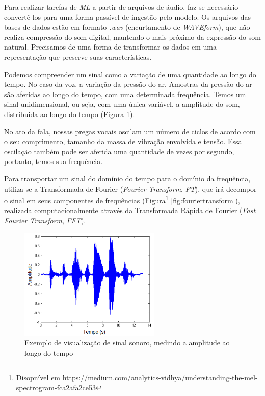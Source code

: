 Para realizar tarefas de \textit{ML} a partir de arquivos de áudio, faz-se necessário convertê-los para uma forma passível de ingestão pelo modelo. Os arquivos das bases de dados estão em formato \textit{.wav} (encurtamento de \textit{WAVEform}), que não realiza compressão do som digital, mantendo-o mais próximo da expressão do som natural. Precisamos de uma forma de transformar os dados em uma representação que preserve suas características.

Podemos compreender um sinal como a variação de uma quantidade ao longo do tempo. No caso da voz, a variação da pressão do ar. Amostras da pressão do ar são aferidas ao longo do tempo, com uma determinada frequência. Temos um sinal unidimensional, ou seja, com uma única variável, a amplitude do som, distribuida ao longo do tempo (Figura \ref{fig:exsinalsom}).

No ato da fala, nossas pregas vocais oscilam um número de ciclos de acordo com o  seu comprimento, tamanho da massa de vibração envolvida e tensão. Essa oscilação também pode ser aferida uma quantidade de vezes por segundo, portanto, temos sua frequência.

Para transportar um sinal do domínio do tempo para o domínio da frequência, utiliza-se a Transformada de Fourier (\textit{Fourier Transform}, \textit{FT}), que irá decompor o sinal em seus componentes de frequências (Figura\footnote{Disopnível em \url{https://medium.com/analytics-vidhya/understanding-the-mel-spectrogram-fca2afa2ce53}} \ref{fig:fouriertransform}), realizada computacionalmente através da Transformada Rápida de Fourier (\textit{Fast Fourier Transform}, \textit{FFT}). 

\begin{figure}[!h]
\centering
\includegraphics[width=0.6\textwidth]{imagens/exsinalsom.PNG}
\caption{\label{fig:exsinalsom}Exemplo de visualização de sinal sonoro, medindo a amplitude ao longo do tempo}
\author{Fonte: UNESP, Prinípios de Comunicações, 2013}
\end{figure}

